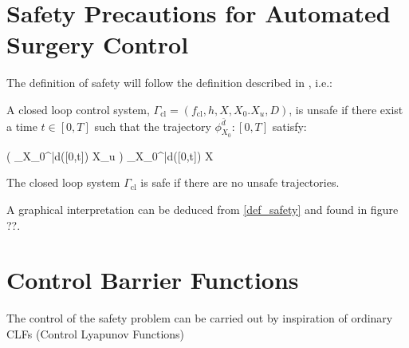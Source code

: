 \section{Safety Precautions for Automated Surgery Control}
The definition of safety will follow the definition described in \citep{bib:safety}, i.e.:
\begin{exa}
A closed loop control system, $\Gamma_\text{cl} = (f_\text{cl},h,X,X_0.X_u,D)$, is unsafe if there exist a time $t \in [0,T]$ such that the trajectory $\phi_{X_0}^{\bar{d}} : [0,T]$ satisfy: 
	\begin{flalign*}
		\left( \phi_{X_0}^{\bar{d}}([0,t]) \cap X_u \right) \neq \emptyset \kk \wedge \kk 
		\phi_{X_0}^{\bar{d}}([0,t]) \subseteq X
	\end{flalign*}
The closed loop system $\Gamma_\text{cl}$ is safe if there are no unsafe trajectories.
\label{def_safety}
\end{exa}
A graphical interpretation can be deduced from \autoref{def_safety} and found in figure ??.
\section{Control Barrier Functions}
The control of the safety problem can be carried out by inspiration of ordinary CLFs (Control Lyapunov Functions) \citep{bib:org_control}